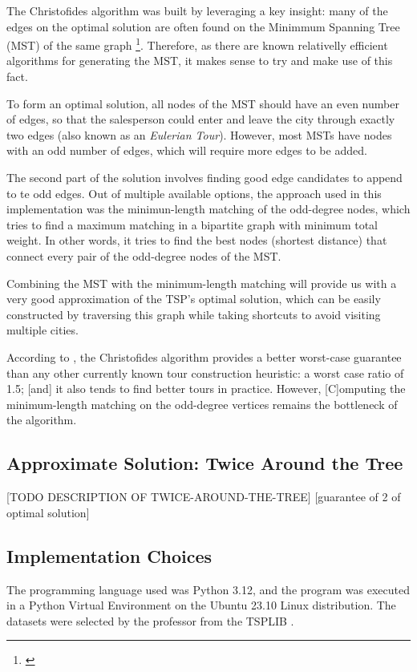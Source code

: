 \documentclass[12pt]{article}
\begin{document}
The Christofides algorithm was built by leveraging a key insight: many of the edges on the 
optimal solution are often found on the Minimmum Spanning Tree (MST) of the same graph 
\footnote{\cite{reducible_explanation}}. Therefore, as there are known relativelly efficient 
algorithms for generating the MST, it makes sense to try and make use of this fact.

To form an optimal solution, all nodes of the MST should have an even number of edges, so 
that the salesperson could enter and leave the city through exactly two edges (also known as an 
\textit{Eulerian Tour}). However, most MSTs have nodes with an odd number of edges, 
which will require more edges to be added.

The second part of the solution involves finding good edge candidates to append to te odd 
edges. Out of multiple available options, the approach used in this implementation was the minimun-length
matching of the odd-degree nodes, which tries to find a maximum matching in a bipartite 
graph with minimum total weight. In other words, it tries to find the best nodes (shortest distance) 
that connect every pair of the odd-degree nodes of the MST.

Combining the MST with the minimum-length matching will provide us with a very good 
approximation of the TSP's optimal solution, which can be easily constructed by
traversing this graph while taking shortcuts to avoid visiting multiple cities.

According to \cite{Johnson2003}, the Christofides algorithm provides a better 
worst-case guarantee than any other currently known tour construction heuristic: a worst case ratio of 1.5; 
[and] it also tends to find better tours in practice. However, [C]omputing the minimum-length 
matching on the odd-degree vertices remains the bottleneck of the algorithm.

\subsection{Approximate Solution: Twice Around the Tree}

[TODO DESCRIPTION OF TWICE-AROUND-THE-TREE]
[guarantee of 2 of optimal solution]

\subsection{Implementation Choices}

The programming language used was Python 3.12, and the program was executed 
in a Python Virtual Environment on the Ubuntu 23.10 Linux distribution. The datasets 
were selected by the professor from the TSPLIB \cite{datasets_lib}.
\end{document}
